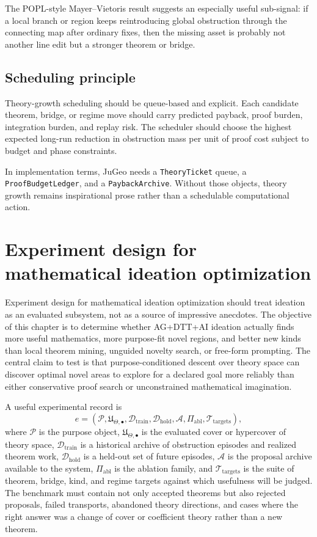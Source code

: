 \documentclass[11pt]{report}
\begin{document}
The POPL-style Mayer--Vietoris result suggests an especially useful sub-signal: if a local branch or region keeps reintroducing global obstruction through the connecting map after ordinary fixes, then the missing asset is probably not another line edit but a stronger theorem or bridge.

\section{Scheduling principle}
Theory-growth scheduling should be queue-based and explicit. Each candidate theorem, bridge, or regime move should carry predicted payback, proof burden, integration burden, and replay risk. The scheduler should choose the highest expected long-run reduction in obstruction mass per unit of proof cost subject to budget and phase constraints.

In implementation terms, JuGeo needs a \texttt{TheoryTicket} queue, a \texttt{ProofBudgetLedger}, and a \texttt{PaybackArchive}. Without those objects, theory growth remains inspirational prose rather than a schedulable computational action.

\chapter{Experiment design for mathematical ideation optimization}
Experiment design for mathematical ideation optimization should treat ideation as an evaluated subsystem, not as a source of impressive anecdotes. The objective of this chapter is to determine whether AG+DTT+AI ideation actually finds more useful mathematics, more purpose-fit novel regions, and better new kinds than local theorem mining, unguided novelty search, or free-form prompting. The central claim to test is that purpose-conditioned descent over theory space can discover optimal novel areas to explore for a declared goal more reliably than either conservative proof search or unconstrained mathematical imagination.

A useful experimental record is
\[
e = (\mathcal{P},\mathfrak{U}_{\Theta,\bullet},\mathcal{D}_{\mathrm{train}},\mathcal{D}_{\mathrm{hold}},\mathcal{A},\Pi_{\mathrm{abl}},\mathcal{T}_{\mathrm{targets}}),
\]
where $\mathcal{P}$ is the purpose object, $\mathfrak{U}_{\Theta,\bullet}$ is the evaluated cover or hypercover of theory space, $\mathcal{D}_{\mathrm{train}}$ is a historical archive of obstruction episodes and realized theorem work, $\mathcal{D}_{\mathrm{hold}}$ is a held-out set of future episodes, $\mathcal{A}$ is the proposal archive available to the system, $\Pi_{\mathrm{abl}}$ is the ablation family, and $\mathcal{T}_{\mathrm{targets}}$ is the suite of theorem, bridge, kind, and regime targets against which usefulness will be judged. The benchmark must contain not only accepted theorems but also rejected proposals, failed transports, abandoned theory directions, and cases where the right answer was a change of cover or coefficient theory rather than a new theorem.
\end{document}
